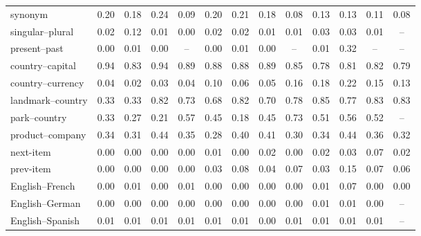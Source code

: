 \begin{tabular}{@{}lcccccccccccc@{}}
synonym & 0.20 & 0.18 & 0.24 & 0.09 & 0.20 & 0.21 & 0.18 & 0.08 & 0.13 & 0.13 & 0.11 & 0.08 \\
singular--plural & 0.02 & 0.12 & 0.01 & 0.00 & 0.02 & 0.02 & 0.01 & 0.01 & 0.03 & 0.03 & 0.01 & -- \\
present--past & 0.00 & 0.01 & 0.00 & -- & 0.00 & 0.01 & 0.00 & -- & 0.01 & 0.32 & -- & -- \\
country--capital & 0.94 & 0.83 & 0.94 & 0.89 & 0.88 & 0.88 & 0.89 & 0.85 & 0.78 & 0.81 & 0.82 & 0.79 \\
country--currency & 0.04 & 0.02 & 0.03 & 0.04 & 0.10 & 0.06 & 0.05 & 0.16 & 0.18 & 0.22 & 0.15 & 0.13 \\
landmark--country & 0.33 & 0.33 & 0.82 & 0.73 & 0.68 & 0.82 & 0.70 & 0.78 & 0.85 & 0.77 & 0.83 & 0.83 \\
park--country & 0.33 & 0.27 & 0.21 & 0.57 & 0.45 & 0.18 & 0.45 & 0.73 & 0.51 & 0.56 & 0.52 & -- \\
product--company & 0.34 & 0.31 & 0.44 & 0.35 & 0.28 & 0.40 & 0.41 & 0.30 & 0.34 & 0.44 & 0.36 & 0.32 \\
next-item & 0.00 & 0.00 & 0.00 & 0.00 & 0.01 & 0.00 & 0.02 & 0.00 & 0.02 & 0.03 & 0.07 & 0.02 \\
prev-item & 0.00 & 0.00 & 0.00 & 0.00 & 0.03 & 0.08 & 0.04 & 0.07 & 0.03 & 0.15 & 0.07 & 0.06 \\
English--French & 0.00 & 0.01 & 0.00 & 0.01 & 0.00 & 0.00 & 0.00 & 0.00 & 0.01 & 0.07 & 0.00 & 0.00 \\
English--German & 0.00 & 0.00 & 0.00 & 0.00 & 0.00 & 0.00 & 0.00 & 0.00 & 0.01 & 0.01 & 0.00 & -- \\
English--Spanish & 0.01 & 0.01 & 0.01 & 0.01 & 0.01 & 0.01 & 0.00 & 0.01 & 0.01 & 0.01 & 0.01 & -- \\
\bottomrule
\end{tabular}
